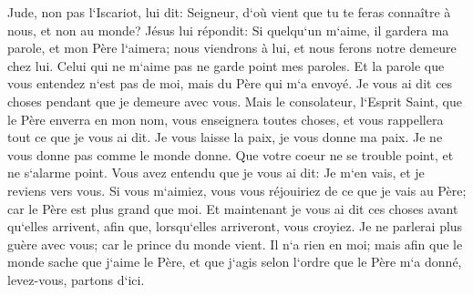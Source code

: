 \verse Jude, non pas l`Iscariot, lui dit: Seigneur, d`où vient que tu te feras connaître à nous, et non au monde? 
\verse Jésus lui répondit: Si quelqu`un m`aime, il gardera ma parole, et mon Père l`aimera; nous viendrons à lui, et nous ferons notre demeure chez lui. 
\verse Celui qui ne m`aime pas ne garde point mes paroles. Et la parole que vous entendez n`est pas de moi, mais du Père qui m`a envoyé. 
\verse Je vous ai dit ces choses pendant que je demeure avec vous. 
\verse Mais le consolateur, l`Esprit Saint, que le Père enverra en mon nom, vous enseignera toutes choses, et vous rappellera tout ce que je vous ai dit. 
\verse Je vous laisse la paix, je vous donne ma paix. Je ne vous donne pas comme le monde donne. Que votre coeur ne se trouble point, et ne s`alarme point. 
\verse Vous avez entendu que je vous ai dit: Je m`en vais, et je reviens vers vous. Si vous m`aimiez, vous vous réjouiriez de ce que je vais au Père; car le Père est plus grand que moi. 
\verse Et maintenant je vous ai dit ces choses avant qu`elles arrivent, afin que, lorsqu`elles arriveront, vous croyiez. 
\verse Je ne parlerai plus guère avec vous; car le prince du monde vient. Il n`a rien en moi; 
\verse mais afin que le monde sache que j`aime le Père, et que j`agis selon l`ordre que le Père m`a donné, levez-vous, partons d`ici. 

